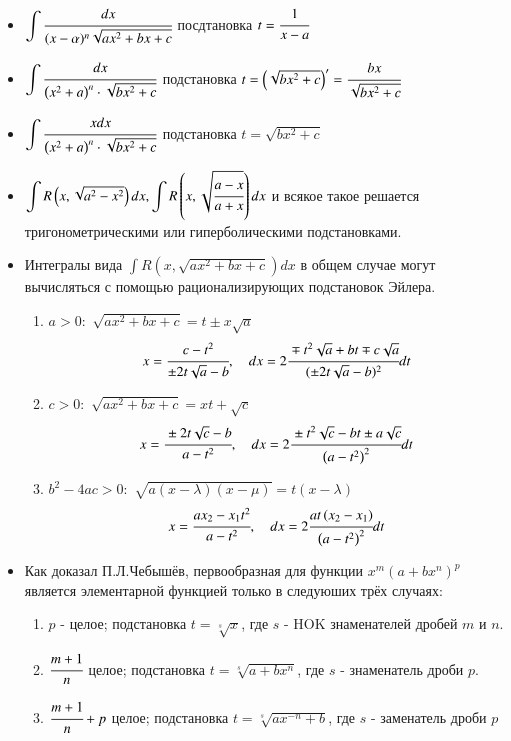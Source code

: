 \documentclass[twoside, a4paperpt, fleqn]{extarticle}
\begin{document}
\begin{itemize}
    \item $\displaystyle \int \cfrac{d x}{(x-\alpha)^{n} \sqrt{a x^{2}+b x+c}}$ посдтановка $t = \cfrac{1}{x-a}$
    
    \item $\displaystyle \int \cfrac{d x}{\left(x^{2}+a\right)^{n} \cdot \sqrt{b x^{2}+c}}$ подстановка $t=\left(\sqrt{b x^{2}+c}\right)^{\prime}=\cfrac{b x}{\sqrt{b x^{2}+c}}$

    \item $\displaystyle \int \cfrac{x d x}{\left(x^{2}+a\right)^{n} \cdot \sqrt{b x^{2}+c}}$ подстановка $t=\sqrt{b x^{2}+c}$
    
    \item $\displaystyle \int R\left(x, \sqrt{a^{2}-x^{2}}\right) d x, \displaystyle \int R\left(x, \sqrt{\cfrac{a-x}{a+x}}\right) d x$ и всякое такое решается тригонометрическими или гиперболическими подстановками.
    \newpage
    \item Интегралы вида $\displaystyle \int R\left(x, \sqrt{a x^{2}+b x+c}\right) d x$ в общем случае могут вычисляться с помощью рационализирующих подстановок Эйлера.
    \begin{enumerate}
        \item $a>0:$ $\sqrt{a x^{2}+b x+c}=t \pm x \sqrt{a}$
        $$
        x=\cfrac{c-t^{2}}{\pm 2 t \sqrt{a}-b}, \quad d x=2 \cfrac{\mp t^{2} \sqrt{a}+b t \mp c \sqrt{a}}{(\pm 2 t \sqrt{a}-b)^{2}} d t
        $$
        \item $c>0:$ $\sqrt{a x^{2}+b x+c}=x t+\sqrt{c}$
        $$
        x=\cfrac{\pm 2 t \sqrt{c}-b}{a-t^{2}}, \quad d x=2 \cfrac{\pm t^{2} \sqrt{c}-b t \pm a \sqrt{c}}{\left(a-t^{2}\right)^{2}} d t
        $$
        \item $b^{2}-4 a c>0:$ $\sqrt{a(x-\lambda)(x-\mu)}=t(x-\lambda)$
        $$
        x=\cfrac{a x_{2}-x_{1} t^{2}}{a-t^{2}},\quad d x=2 \cfrac{a t\left(x_{2}-x_{1}\right)}{\left(a-t^{2}\right)^{2}} d t
        $$
    \end{enumerate}

    \item Как доказал П.Л.Чебышёв, первообразная для функции $x^{m}\left(a+b x^{n}\right)^{p}$ является элементарной функцией только в следуюших трёх случаях:
    \begin{enumerate}
        \item $p$ - целое; подстановка $t=\sqrt[s]{x}$, где $s$ - HOK знаменателей дробей $m$ и $n$.
        \item $\cfrac{m+1}{n}$ целое; подстановка $t=\sqrt[s]{a+b x^{n}}$, где $s$ - знаменатель дроби $p$.
        \item $\cfrac{m+1}{n}+p$ целое; подстановка $t=\sqrt[s]{a x^{-n}+b}$, где $s$ - заменатель дроби $p$
    \end{enumerate}


\end{itemize}
\end{document}
